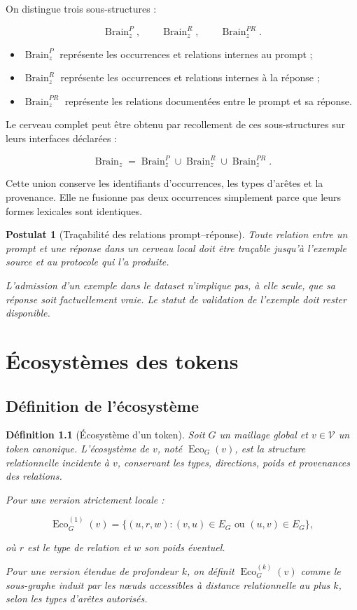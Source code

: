\documentclass[11pt,a4paper,oneside]{book}
\newtheorem{definition}{Définition}[chapter]
\newtheorem{postulat}[definition]{Postulat}
\theoremstyle{remark}
\DeclareMathOperator{\Eco}{Eco}
\DeclareMathOperator{\Brain}{Brain}
\newcommand{\Tokens}{\mathcal{V}}
\begin{document}
On distingue trois sous-structures :

\[
\Brain_z^P,\qquad
\Brain_z^R,\qquad
\Brain_z^{PR}.
\]

\begin{itemize}
  \item \(\Brain_z^P\) représente les occurrences et relations
        internes au prompt ;
  \item \(\Brain_z^R\) représente les occurrences et relations
        internes à la réponse ;
  \item \(\Brain_z^{PR}\) représente les relations documentées
        entre le prompt et sa réponse.
\end{itemize}

Le cerveau complet peut être obtenu par recollement de ces
sous-structures sur leurs interfaces déclarées :

\[
\Brain_z=
\Brain_z^P\cup
\Brain_z^R\cup
\Brain_z^{PR}.
\]

Cette union conserve les identifiants d'occurrences, les types
d'arêtes et la provenance. Elle ne fusionne pas deux occurrences
simplement parce que leurs formes lexicales sont identiques.

\begin{postulat}[Traçabilité des relations prompt--réponse]
Toute relation entre un prompt et une réponse dans un cerveau local
doit être traçable jusqu'à l'exemple source et au protocole qui
l'a produite.

L'admission d'un exemple dans le dataset n'implique pas, à elle
seule, que sa réponse soit factuellement vraie. Le statut de validation
de l'exemple doit rester disponible.
\end{postulat}


\chapter{Écosystèmes des tokens}

\section{Définition de l'écosystème}

\begin{definition}[Écosystème d'un token]
Soit \(G\) un maillage global et \(v\in\Tokens\) un token canonique.
L'écosystème de \(v\), noté \(\Eco_G(v)\), est la structure relationnelle
incidente à \(v\), conservant les types, directions, poids et
provenances des relations.

Pour une version strictement locale :

\[
\Eco_G^{(1)}(v)
=
\{(u,r,w): (v,u)\in E_G
\text{ ou }(u,v)\in E_G\},
\]

où \(r\) est le type de relation et \(w\) son poids éventuel.

Pour une version étendue de profondeur \(k\), on définit
\(\Eco_G^{(k)}(v)\) comme le sous-graphe induit par les nœuds
accessibles à distance relationnelle au plus \(k\), selon les types
d'arêtes autorisés.
\end{definition}
\end{document}
